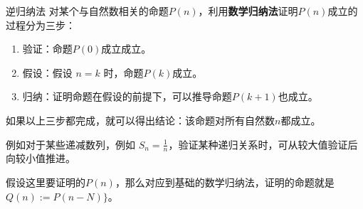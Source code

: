 \begin{definition}{逆归纳法}
对某个与自然数相关的命题$P(n)$，利用\textbf{数学归纳法}证明$P(n)$成立的过程分为三步：
\begin{enumerate}
\item 验证：命题$P(0)$成立成立。
\item 假设：假设 $n = k$ 时，命题$P(k)$成立。
\item 归纳：证明命题在假设的前提下，可以推导命题$P(k+1)$也成立。
\end{enumerate}
如果以上三步都完成，就可以得出结论：该命题对所有自然数$n$都成立。
\end{definition}

例如对于某些递减数列，例如 $S_n = \frac{1}{n}$，验证某种递归关系时，可从较大值验证后向较小值推进。

假设这里要证明的$P(n)$，那么对应到基础的数学归纳法，证明的命题就是$Q(n):=P(n-N)\}$。